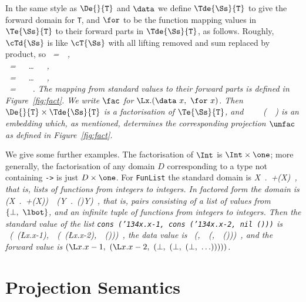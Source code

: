 \documentclass[11pt]{article}
\begin{document}
In the same style as  $\De{}{\mbox{\tt T}}$ and $\data$ we define
$\Tde{\Ss}{\mbox{\tt T}}$ to give the forward domain for \mbox{\tt T}, and $\for$ to be
the function mapping values in $\Te{\Ss}{\mbox{\tt T}}$ to their forward parts
in $\Tde{\Ss}{\mbox{\tt T}}$, as follows.  Roughly, $\cTd{\Ss}$ is like
$\cT{\Ss}$ with all lifting removed and sum replaced by product, so
\beqs
\it \Tde{\Ss}{\tint}\ =\ \one\ ,\espace\\
\it \Tde{\Ss}{\tprod}\ =\ \Tde{\Ss}{\tone}\ \times\ \ldots\ \times\ \Tde{\Ss}{\tn}\ ,\espace\\
\it \Tde{\Ss}{\tsum}\ =\ \Tde{\Ss}{\tone}\ \times\ \ldots\ \times\ \Tde{\Ss}{\tn}\ ,\espace\\
\it \Tde{\Ss}{\tfun}\ =\ \Te{\Ss}{\tone}\ \fto\ \Te{\Ss}{\ttwo}\ .
\eeqs
The mapping from standard values to their forward parts is defined in
Figure~\ref{fig:fact}.
We write $\fac$ for $\Lx.(\data~x,\ \for~x)$.  Then
$\De{}{\mbox{\tt T}}\times\Tde{\Ss}{\mbox{\tt T}}$ is a factorisation of
$\Te{\Ss}{\mbox{\tt T}}$, and
\beqs
\it \fac\ \in\ \ \fto\ (\ \times\ )
\eeqs
is an embedding which, as mentioned, determines the corresponding projection
$\unfac$ as defined in Figure~\ref{fig:fact}.

We give some further examples.  The factorisation of
$\Int$ is $\Int\times\one$; more generally, the factorisation of any
domain $D$ corresponding to a type not containing \mbox{\tt ->} is just
$D\times\one$.  For \mbox{\tt FunList} the standard domain is
\beqqs
\it \mu{}X\ .\ \lone+(\x{}X)\ ,
\eeqqs
that is, lists of functions from integers to integers. In factored form
the domain is
\beqqs
\it (\mu{}X\ .\ \lone+(\lone\x{}X))\ \x\ (\mu{}Y\ .\ (\fto{})\x{}Y)\ ,
\eeqqs
that is, pairs consisting of a list of values from $\{\bot,\ \lbot\}$, and
an infinite tuple of functions from integers to integers.  Then the 
standard value of the list \mbox{\tt cons\ ({\char'134}x.x-1,\ cons\ ({\char'134}x.x-2,\ nil\ ()))} is
\beqqs
\it {}\ (\ (\L{}x.x-{\rm1}),\ \ (\ (\L{}x.x-{\rm2}),\ \ ()))\ ,
\eeqqs
the data value is
\beqqs
\it {}\ (\lunit,\ \ (\lunit,\ \ ()))\ ,
\eeqqs
and the forward value is 
$(\L x.x-1,~(\L x.x-2,~(\bot,~(\bot,~(\bot,~\ldots)))))$.

\section{Projection Semantics}
\end{document}
